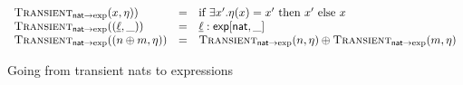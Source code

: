 \begin{figure}
  \begin{displaymath}
    \begin{array}{lcl}
      \textsc{Transient}_{\mathsf{nat} \to \exp}(x, \eta)) &=& \text{if } \exists x'. \eta(x) = x' \text{ then } x' \text{ else } x \\
      \textsc{Transient}_{\mathsf{nat} \to \exp}((\underline{\ell}, \_)) &=& \underline{\ell} : \mathsf{exp}[\mathsf{nat}, \_] \\
      \textsc{Transient}_{\mathsf{nat} \to \exp}((n \oplus m, \eta)) &=& \textsc{Transient}_{\mathsf{nat} \to \exp}(n, \eta) \oplus \textsc{Transient}_{\mathsf{nat} \to \exp}(m, \eta) \\
    \end{array}
  \end{displaymath}
  \caption{Going from transient nats to expressions}
\end{figure}
